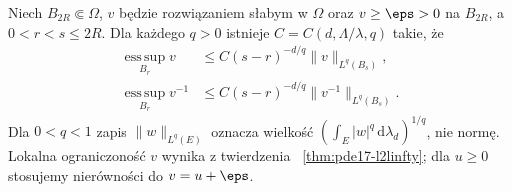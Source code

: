 \begin{lemat}
\label{lem:pde17-moser-iteration}
Niech $B_{2R}\Subset\Omega$, $v$ będzie rozwiązaniem słabym
w $\Omega$ oraz $v\ge\eps>0$ na $B_{2R}$, a $0<r<s\le2R$.
Dla każdego $q>0$ istnieje $C=C(d,\Lambda/\lambda,q)$ takie, że
\begin{align}
 \operatorname*{ess\,sup}_{B_r}v
 &\le C(s-r)^{-d/q}\|v\|_{L^q(B_s)},\label{eq:pde17-moser-up}\\
 \operatorname*{ess\,sup}_{B_r}v^{-1}
 &\le C(s-r)^{-d/q}\|v^{-1}\|_{L^q(B_s)}.
 \label{eq:pde17-moser-inv}
\end{align}
Dla $0<q<1$ zapis $\|w\|_{L^q(E)}$ oznacza wielkość
$(\int_E|w|^q\,\mathrm d\lambda_d)^{1/q}$, nie normę.
Lokalna ograniczoność $v$ wynika z twierdzenia
~\ref{thm:pde17-l2linfty}; dla $u\ge0$ stosujemy
nierówności do $v=u+\eps$.
\end{lemat}
